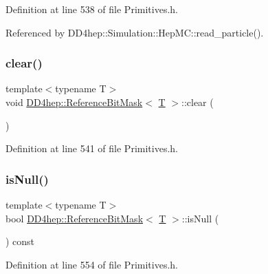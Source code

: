 Definition at line 538 of file Primitives.\+h.



Referenced by D\+D4hep\+::\+Simulation\+::\+Hep\+M\+C\+::read\+\_\+particle().

\hypertarget{class_d_d4hep_1_1_reference_bit_mask_a22b33d5d302fa4e84c10689f07886517}{}\label{class_d_d4hep_1_1_reference_bit_mask_a22b33d5d302fa4e84c10689f07886517} 
\subsubsection{\texorpdfstring{clear()}{clear()}\hspace{0.1cm}{\footnotesize\ttfamily [2/2]}}
{\footnotesize\ttfamily template$<$typename T$>$ \\
void \hyperlink{class_d_d4hep_1_1_reference_bit_mask}{D\+D4hep\+::\+Reference\+Bit\+Mask}$<$ \hyperlink{class_t}{T} $>$\+::clear (\begin{DoxyParamCaption}{ }\end{DoxyParamCaption})\hspace{0.3cm}{\ttfamily [inline]}}



Definition at line 541 of file Primitives.\+h.

\hypertarget{class_d_d4hep_1_1_reference_bit_mask_a5a53ad6f62a0348f608b1a7f33674a67}{}\label{class_d_d4hep_1_1_reference_bit_mask_a5a53ad6f62a0348f608b1a7f33674a67} 
\subsubsection{\texorpdfstring{is\+Null()}{isNull()}}
{\footnotesize\ttfamily template$<$typename T$>$ \\
bool \hyperlink{class_d_d4hep_1_1_reference_bit_mask}{D\+D4hep\+::\+Reference\+Bit\+Mask}$<$ \hyperlink{class_t}{T} $>$\+::is\+Null (\begin{DoxyParamCaption}{ }\end{DoxyParamCaption}) const\hspace{0.3cm}{\ttfamily [inline]}}



Definition at line 554 of file Primitives.\+h.



